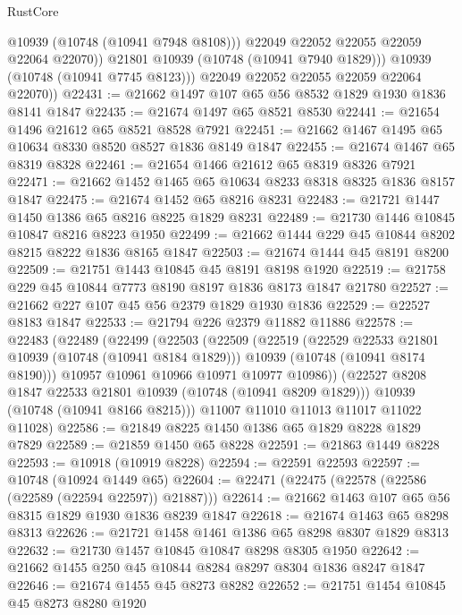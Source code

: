 \begin{lexlean}{RustCore}
\begin{coremodule}
                  @10939
                  (@10748 (@10941 @7948 @8108)))
                @22049
                @22052
                @22055
                @22059
                @22064
                @22070))
            @21801
            @10939
            (@10748 (@10941 @7940 @1829)))
          @10939
          (@10748 (@10941 @7745 @8123)))
        @22049
        @22052
        @22055
        @22059
        @22064
        @22070))
@22431 := @21662 @1497 @107 @65 @56 @8532 @1829 @1930 @1836 @8141 @1847
@22435 := @21674 @1497 @65 @8521 @8530
@22441 := @21654 @1496 @21612 @65 @8521 @8528 @7921
@22451 := @21662 @1467 @1495 @65 @10634 @8330 @8520 @8527 @1836 @8149 @1847
@22455 := @21674 @1467 @65 @8319 @8328
@22461 := @21654 @1466 @21612 @65 @8319 @8326 @7921
@22471 := @21662 @1452 @1465 @65 @10634 @8233 @8318 @8325 @1836 @8157 @1847
@22475 := @21674 @1452 @65 @8216 @8231
@22483 := @21721 @1447 @1450 @1386 @65 @8216 @8225 @1829 @8231
@22489 := @21730 @1446 @10845 @10847 @8216 @8223 @1950
@22499 := @21662 @1444 @229 @45 @10844 @8202 @8215 @8222 @1836 @8165 @1847
@22503 := @21674 @1444 @45 @8191 @8200
@22509 := @21751 @1443 @10845 @45 @8191 @8198 @1920
@22519 := @21758 @229 @45 @10844 @7773 @8190 @8197 @1836 @8173 @1847 @21780
@22527 := @21662 @227 @107 @45 @56 @2379 @1829 @1930 @1836
@22529 := @22527 @8183 @1847
@22533 := @21794 @226 @2379 @11882 @11886
@22578 := @22483
    (@22489
      (@22499
        (@22503
          (@22509
            (@22519
              (@22529 @22533 @21801 @10939 (@10748 (@10941 @8184 @1829)))
              @10939
              (@10748 (@10941 @8174 @8190)))
            @10957
            @10961
            @10966
            @10971
            @10977
            @10986))
        (@22527 @8208 @1847 @22533 @21801 @10939 (@10748 (@10941 @8209 @1829)))
        @10939
        (@10748 (@10941 @8166 @8215)))
      @11007
      @11010
      @11013
      @11017
      @11022
      @11028)
@22586 := @21849 @8225 @1450 @1386 @65 @1829 @8228 @1829 @7829
@22589 := @21859 @1450 @65 @8228
@22591 := @21863 @1449 @8228
@22593 := @10918 (@10919 @8228)
@22594 := @22591 @22593
@22597 := @10748 (@10924 @1449 @65)
@22604 := @22471 (@22475 (@22578 (@22586 (@22589 (@22594 @22597)) @21887)))
@22614 := @21662 @1463 @107 @65 @56 @8315 @1829 @1930 @1836 @8239 @1847
@22618 := @21674 @1463 @65 @8298 @8313
@22626 := @21721 @1458 @1461 @1386 @65 @8298 @8307 @1829 @8313
@22632 := @21730 @1457 @10845 @10847 @8298 @8305 @1950
@22642 := @21662 @1455 @250 @45 @10844 @8284 @8297 @8304 @1836 @8247 @1847
@22646 := @21674 @1455 @45 @8273 @8282
@22652 := @21751 @1454 @10845 @45 @8273 @8280 @1920

\end{coremodule}
\end{lexlean}
